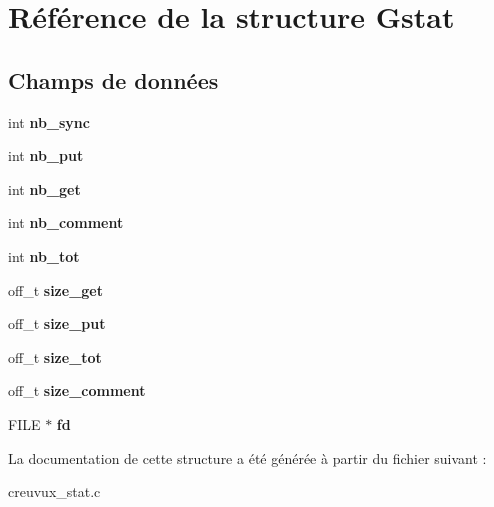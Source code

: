 \hypertarget{struct_gstat}{\section{Référence de la structure Gstat}
\label{struct_gstat}
}
\subsection*{Champs de données}
\begin{DoxyCompactItemize}
\item 
\hypertarget{struct_gstat_a1b3d4d20a7d1b8d3232a35dd689ecfc9}{int {\bfseries nb\-\_\-sync}}\label{struct_gstat_a1b3d4d20a7d1b8d3232a35dd689ecfc9}

\item 
\hypertarget{struct_gstat_a6c53f9a18d82d8b3eb69db87bebb5278}{int {\bfseries nb\-\_\-put}}\label{struct_gstat_a6c53f9a18d82d8b3eb69db87bebb5278}

\item 
\hypertarget{struct_gstat_a9c5fc500b4e111d67e3116a98fc0079a}{int {\bfseries nb\-\_\-get}}\label{struct_gstat_a9c5fc500b4e111d67e3116a98fc0079a}

\item 
\hypertarget{struct_gstat_a3b935650d378d427a56b873a84a80106}{int {\bfseries nb\-\_\-comment}}\label{struct_gstat_a3b935650d378d427a56b873a84a80106}

\item 
\hypertarget{struct_gstat_ab546ca1885cfe0cb636237597b6c03ea}{int {\bfseries nb\-\_\-tot}}\label{struct_gstat_ab546ca1885cfe0cb636237597b6c03ea}

\item 
\hypertarget{struct_gstat_ae2c60a5b9873f763ab7636ef25953c00}{off\-\_\-t {\bfseries size\-\_\-get}}\label{struct_gstat_ae2c60a5b9873f763ab7636ef25953c00}

\item 
\hypertarget{struct_gstat_a750fc6b8808d30cb4c5c262e2ae81e80}{off\-\_\-t {\bfseries size\-\_\-put}}\label{struct_gstat_a750fc6b8808d30cb4c5c262e2ae81e80}

\item 
\hypertarget{struct_gstat_a98544d36afdaaa3f139da8f248c2bb99}{off\-\_\-t {\bfseries size\-\_\-tot}}\label{struct_gstat_a98544d36afdaaa3f139da8f248c2bb99}

\item 
\hypertarget{struct_gstat_a33a60d65e3b7ae90db3421d39935178a}{off\-\_\-t {\bfseries size\-\_\-comment}}\label{struct_gstat_a33a60d65e3b7ae90db3421d39935178a}

\item 
\hypertarget{struct_gstat_a600b792d6d2ff2e71096dfa60d97a3b0}{F\-I\-L\-E $\ast$ {\bfseries fd}}\label{struct_gstat_a600b792d6d2ff2e71096dfa60d97a3b0}

\end{DoxyCompactItemize}


La documentation de cette structure a été générée à partir du fichier suivant \-:\begin{DoxyCompactItemize}
\item 
creuvux\-\_\-stat.\-c\end{DoxyCompactItemize}

